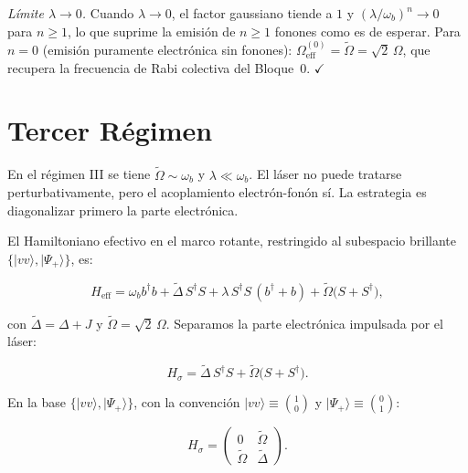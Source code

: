 \documentclass[12pt]{article}
\begin{document}
	\medskip
	\noindent
	\textit{L\'imite $\lambda \to 0$.}
	Cuando $\lambda \to 0$, el factor gaussiano tiende a $1$ y
	$(\lambda/\omega_b)^n \to 0$ para $n \geq 1$, lo que suprime
	la emisi\'on de $n \geq 1$ fonones como es de esperar. Para $n = 0$
	(emisi\'on puramente electr\'onica sin fonones):
	$\Omega_\mathrm{eff}^{(0)} = \widetilde\Omega = \sqrt{2}\,\Omega$,
	que recupera la frecuencia de Rabi colectiva del Bloque~0.
	$\checkmark$

\section{Tercer Régimen}

En el r\'egimen III se tiene $\widetilde\Omega \sim \omega_b$ y
$\lambda \ll \omega_b$. El l\'aser no puede tratarse perturbativamente,
pero el acoplamiento electr\'on-fon\'on s\'i. La estrategia es
diagonalizar primero la parte electr\'onica.

El Hamiltoniano efectivo en el marco rotante, restringido al subespacio
brillante $\{|vv\rangle, |\Psi_+\rangle\}$, es:

\begin{equation}
	H_\mathrm{eff} = \omega_b b^\dagger b
	+ \widetilde\Delta\, S^\dagger S
	+ \lambda\, S^\dagger S\,(b^\dagger + b)
	+ \widetilde\Omega\bigl(S + S^\dagger\bigr),
	\label{eq:Heff_III}
\end{equation}

con $\widetilde\Delta = \Delta + J$ y $\widetilde\Omega = \sqrt{2}\,\Omega$.
Separamos la parte electr\'onica impulsada por el l\'aser:

\begin{equation}
	H_\sigma = \widetilde\Delta\, S^\dagger S
	+ \widetilde\Omega\bigl(S + S^\dagger\bigr).
	\label{eq:Hsigma}
\end{equation}

En la base $\{|vv\rangle, |\Psi_+\rangle\}$, con la convenci\'on
$|vv\rangle \equiv \binom{1}{0}$ y $|\Psi_+\rangle \equiv \binom{0}{1}$:

\begin{equation}
	H_\sigma = \begin{pmatrix} 0 & \widetilde\Omega \\
		\widetilde\Omega & \widetilde\Delta \end{pmatrix}.
	\label{eq:Hsigma_matrix}
\end{equation}
\end{document}

